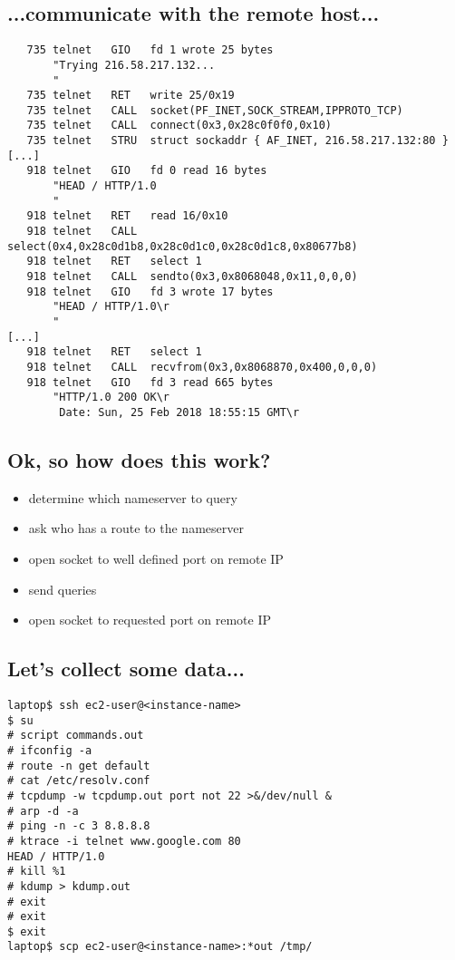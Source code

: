\documentclass[xga]{xdvislides}
\newcommand{\smallish}{\fontsize{16}{16}\selectfont}
\begin{document}
\subsection{...communicate with the remote host...}
\smallish
\begin{verbatim}
   735 telnet   GIO   fd 1 wrote 25 bytes
       "Trying 216.58.217.132...
       "
   735 telnet   RET   write 25/0x19
   735 telnet   CALL  socket(PF_INET,SOCK_STREAM,IPPROTO_TCP)
   735 telnet   CALL  connect(0x3,0x28c0f0f0,0x10)
   735 telnet   STRU  struct sockaddr { AF_INET, 216.58.217.132:80 }
[...]
   918 telnet   GIO   fd 0 read 16 bytes
       "HEAD / HTTP/1.0
       "
   918 telnet   RET   read 16/0x10
   918 telnet   CALL  select(0x4,0x28c0d1b8,0x28c0d1c0,0x28c0d1c8,0x80677b8)
   918 telnet   RET   select 1
   918 telnet   CALL  sendto(0x3,0x8068048,0x11,0,0,0)
   918 telnet   GIO   fd 3 wrote 17 bytes
       "HEAD / HTTP/1.0\r
       "
[...]
   918 telnet   RET   select 1
   918 telnet   CALL  recvfrom(0x3,0x8068870,0x400,0,0,0)
   918 telnet   GIO   fd 3 read 665 bytes
       "HTTP/1.0 200 OK\r
        Date: Sun, 25 Feb 2018 18:55:15 GMT\r
\end{verbatim}
\Normalsize

\subsection{Ok, so how does this work?}
\begin{itemize}
	\item determine which nameserver to query
	\item ask who has a route to the nameserver
	\item open socket to well defined port on remote IP
	\item send queries
	\item open socket to requested port on remote IP
\end{itemize}

\subsection{Let's collect some data...}
\begin{verbatim}
laptop$ ssh ec2-user@<instance-name>
$ su
# script commands.out
# ifconfig -a
# route -n get default
# cat /etc/resolv.conf
# tcpdump -w tcpdump.out port not 22 >&/dev/null &
# arp -d -a
# ping -n -c 3 8.8.8.8
# ktrace -i telnet www.google.com 80
HEAD / HTTP/1.0
# kill %1
# kdump > kdump.out
# exit
# exit
$ exit
laptop$ scp ec2-user@<instance-name>:*out /tmp/
\end{verbatim}
\end{document}
